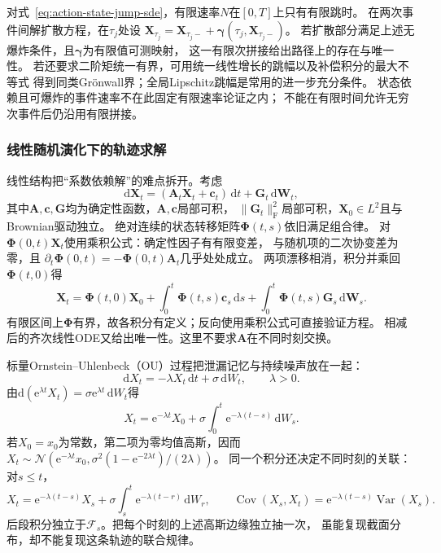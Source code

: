 对式~\eqref{eq:action-state-jump-sde}，有限速率$N$在$[0,T]$上只有有限跳时。
在两次事件间解扩散方程，在$\tau_j$处设
$\bm X_{\tau_j}=\bm X_{\tau_j-}
                    +\bm\gamma(\tau_j,\bm X_{\tau_j-})$。
若扩散部分满足上述无爆炸条件，且$\bm\gamma$为有限值可测映射，
这一有限次拼接给出路径上的存在与唯一性。
若还要求二阶矩统一有界，可用统一线性增长的跳幅以及补偿积分的最大不等式
得到同类Grönwall界；全局Lipschitz跳幅是常用的进一步充分条件。
状态依赖且可爆炸的事件速率不在此固定有限速率论证之内；
不能在有限时间允许无穷次事件后仍沿用有限拼接。

\subsubsection{线性随机演化下的轨迹求解}
\label{sec:action-state-linear-sde-solution}

线性结构把“系数依赖解”的难点拆开。考虑
\[
 \mathrm d\bm X_t=(\bm A_t\bm X_t+\bm c_t)\,\mathrm dt
                       +\bm G_t\,\mathrm d\bm W_t,
\]
其中$\bm A,\bm c,\bm G$均为确定性函数，$\bm A,\bm c$局部可积，
$\|\bm G_t\|_{\mathrm F}^2$局部可积，$\bm X_0\in L^2$且与Brownian驱动独立。
绝对连续的状态转移矩阵$\bm\Phi(t,s)$依旧满足组合律。
对$\bm\Phi(0,t)\bm X_t$使用乘积公式：确定性因子有有限变差，
与随机项的二次协变差为零，且
$\partial_t\bm\Phi(0,t)=-\bm\Phi(0,t)\bm A_t$几乎处处成立。
两项漂移相消，积分并乘回$\bm\Phi(t,0)$得
\begin{equation}
 \bm X_t=\bm\Phi(t,0)\bm X_0+
       \int_0^t\bm\Phi(t,s)\bm c_s\,\mathrm ds+
       \int_0^t\bm\Phi(t,s)\bm G_s\,\mathrm d\bm W_s.
 \label{eq:action-state-linear-sde-solution}
\end{equation}
有限区间上$\bm\Phi$有界，故各积分有定义；反向使用乘积公式可直接验证方程。
相减后的齐次线性ODE又给出唯一性。这里不要求$\bm A$在不同时刻交换。

标量Ornstein--Uhlenbeck（OU）过程把泄漏记忆与持续噪声放在一起：
\begin{equation}
 \mathrm dX_t=-\lambda X_t\,\mathrm dt+\sigma\,\mathrm dW_t,\qquad\lambda>0.
 \label{eq:dynamical-ou-sde}
\end{equation}
由$\mathrm d(\mathrm e^{\lambda t}X_t)=
\sigma\mathrm e^{\lambda t}\,\mathrm dW_t$得
\[
 X_t=\mathrm e^{-\lambda t}X_0+
                  \sigma\int_0^t\mathrm e^{-\lambda(t-s)}\,\mathrm dW_s.
\]
若$X_0=x_0$为常数，第二项为零均值高斯，因而
$X_t\sim\mathcal N(\mathrm e^{-\lambda t}x_0,
\sigma^2(1-\mathrm e^{-2\lambda t})/(2\lambda))$。
同一个积分还决定不同时刻的关联：对$s\leq t$，
\[
 X_t=\mathrm e^{-\lambda(t-s)}X_s+
          \sigma\int_s^t\mathrm e^{-\lambda(t-r)}\,\mathrm dW_r,
 \qquad
 \operatorname{Cov}(X_s,X_t)=
          \mathrm e^{-\lambda(t-s)}\operatorname{Var}(X_s).
\]
后段积分独立于$\mathcal F_s$。把每个时刻的上述高斯边缘独立抽一次，
虽能复现截面分布，却不能复现这条轨迹的联合规律。

